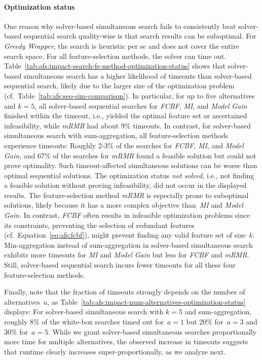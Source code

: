 \documentclass{article}
\theoremstyle{definition}
\begin{document}
\paragraph{Optimization status}

One reason why solver-based simultaneous search fails to consistently beat solver-based sequential search quality-wise is that search results can be suboptimal.
For \emph{Greedy Wrapper}, the search is heuristic per se and does not cover the entire search space.
For all feature-selection methods, the solver can time out.
Table~\ref{tab:afs:impact-search-fs-method-optimization-status} shows that solver-based simultaneous search has a higher likelihood of timeouts than solver-based sequential search, likely due to the larger size of the optimization problem (cf.~Table~\ref{tab:afs:seq-sim-comparison}).
In particular, for up to five alternatives and $k=5$, all solver-based sequential searches for \emph{FCBF}, \emph{MI}, and \emph{Model Gain} finished within the timeout, i.e., yielded the optimal feature set or ascertained infeasibility, while \emph{mRMR} had about 9\% timeouts.
In contrast, for solver-based simultaneous search with sum-aggregation, all feature-selection methods experience timeouts:
Roughly 2-3\% of the searches for \emph{FCBF}, \emph{MI}, and \emph{Model Gain}, and 67\% of the searches for \emph{mRMR} found a feasible solution but could not prove optimality.
Such timeout-affected simultaneous solutions can be worse than optimal sequential solutions.
The optimization status \emph{not solved}, i.e., not finding a feasible solution without proving infeasibility, did not occur in the displayed results.
The feature-selection method \emph{mRMR} is especially prone to suboptimal solutions, likely because it has a more complex objective than~\emph{MI} and \emph{Model Gain}.
In contrast, \emph{FCBF} often results in infeasible optimization problems since its constraints, preventing the selection of redundant features (cf.~Equation~\ref{eq:afs:fcbf}), might prevent finding any valid feature set of size~$k$.
Min-aggregation instead of sum-aggregation in solver-based simultaneous search exhibits more timeouts for \emph{MI} and \emph{Model Gain} but less for \emph{FCBF} and \emph{mRMR}.
Still, solver-based sequential search incurs fewer timeouts for all these four feature-selection methods.

Finally, note that the fraction of timeouts strongly depends on the number of alternatives~$a$, as Table~\ref{tab:afs:impact-num-alternatives-optimization-status} displays:
For solver-based simultaneous search with $k=5$ and sum-aggregation, roughly 8\% of the white-box searches timed out for~$a=1$ but 20\% for~$a=3$ and 30\% for~$a=5$.
While we grant solver-based simultaneous searches proportionally more time for multiple alternatives, the observed increase in timeouts suggests that runtime clearly increases super-proportionally, as we analyze next.
\end{document}
